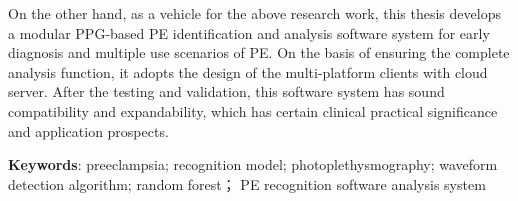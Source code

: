 On the other hand, as a vehicle for the above research work, this thesis develops a modular PPG-based PE identification and analysis 
software system for early diagnosis and multiple use scenarios of PE. 
On the basis of ensuring the complete analysis function, it adopts the design of the multi-platform clients with cloud server.
After the testing and validation, this software system has sound compatibility and expandability, which has certain clinical practical significance and application 
prospects.

\vspace{2em}

\textbf{Keywords}: preeclampsia; recognition model; photoplethysmography; waveform detection algorithm; random forest；
PE recognition software analysis system